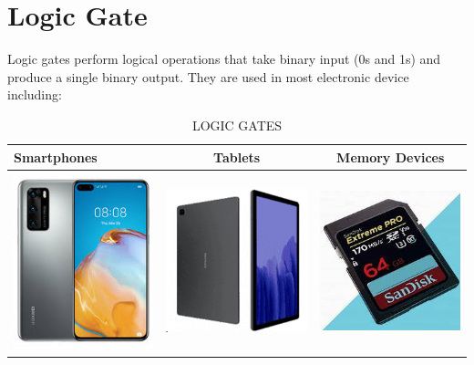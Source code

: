 \documentclass{article}
\begin{document}
	\section{Logic Gate}
	Logic gates perform logical operations that take binary input (0s and 1s) and produce  a single binary output. They are used in most electronic device including:
	\begin{table}[h!]
		\begin{center}
			\caption{LOGIC GATES}
	 		\label{tab:table1}
			\begin{tabular}{|l|c|c|}
				\hline
				Smartphones
				&
				Tablets
				&
				Memory Devices
				\\
				\hline
				\includegraphics[width=0.2\linewidth]{smartphone1}
				&
				\includegraphics[width=0.25\linewidth]{Tablet}
				&
		     	\includegraphics[width=0.25\linewidth]{memory disk}
				\\
				  \hline
				  \end{tabular}
			
				
		\end{center}
	\end{table}
	
\end{document}
